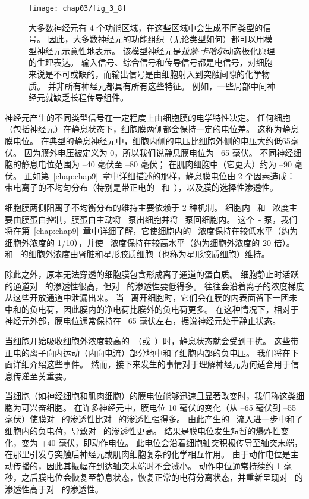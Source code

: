 \begin{figure}[htbp]
	\centering
	\texttt{[image: chap03/fig\_3\_8]}
	\caption{大多数神经元有 4 个功能区域，在这些区域中会生成不同类型的信号。
		因此，大多数神经元的功能组织（无论类型如何）都可以用模型神经元示意性地表示。
		该模型神经元是\textit{拉蒙$\cdot$卡哈尔}动态极化原理的生理表达。 
		输入信号、综合信号和传导信号都是电信号，对细胞来说是不可或缺的，而输出信号是由细胞射入到突触间隙的化学物质。
		并非所有神经元都具有所有这些特征。 
		例如，一些局部中间神经元就缺乏长程传导组件。}
	\label{fig:3_8}
\end{figure}


神经元产生的不同类型信号在一定程度上由细胞膜的电学特性决定。
任何细胞（包括神经元）在静息状态下，细胞膜两侧都会保持一定的电位差。
这称为静息膜电位。 
在典型的静息神经元中，细胞内侧的电压比细胞外侧的电压大约低65毫伏。
因为膜外电压被定义为 0，所以我们说静息膜电位为 –65 毫伏。
不同神经细胞的静息电位范围为 –40 毫伏至 –80 毫伏； 
在肌肉细胞中（它更大）约为 –90 毫伏。
正如第~\ref{chap:chap9}~章中详细描述的那样，静息膜电位由 2 个因素造成：
带电离子的不均匀分布（特别是带正电的~ 和~），以及膜的选择性渗透性。


细胞膜两侧阳离子不均衡分布的维持主要依赖于 2 种机制。
细胞内~ 和~ 浓度主要由膜蛋白控制，膜蛋白主动将~ 泵出细胞并将~ 泵回细胞内。
这个~- 泵，我们将在第~\ref{chap:chap9}~章中详细了解，它使细胞内的~ 浓度保持在较低水平（约为细胞外浓度的 1/10），并使~ 浓度保持在较高水平（约为细胞外浓度的 20 倍）。
 和~ 的细胞外浓度由肾脏和星形胶质细胞（也称为星形胶质细胞）维持。


除此之外，原本无法穿透的细胞膜包含形成离子通道的蛋白质。
细胞静止时活跃的通道对~ 的渗透性很高，但对~ 的渗透性要低得多。
 往往会沿着离子的浓度梯度从这些开放通道中泄漏出来。
当~ 离开细胞时，它们会在膜的内表面留下一团未中和的负电荷，因此膜内的净电荷比膜外的负电荷更多。
在这种情况下，相对于神经元外部，膜电位通常保持在 –65 毫伏左右，据说神经元处于静止状态。


当细胞开始吸收细胞外浓度较高的~（或~）时，静息状态就会受到干扰。
这些带正电的离子向内运动（内向电流）部分地中和了细胞内部的负电压。 
我们将在下面详细介绍这些事件。 
然而，接下来发生的事情对于理解神经元为何适合用于信息传递至关重要。


当细胞（如神经细胞和肌肉细胞）的膜电位能够迅速且显著改变时，我们称这类细胞为可兴奋细胞。 
在许多神经元中，膜电位 10 毫伏的变化（从 –65 毫伏到 –55 毫伏）使膜对~ 的渗透性比对~ 的渗透性强得多。
由此产生的~ 流入进一步中和了细胞内的负电荷，导致对~ 的渗透性更高。
结果是膜电位发生短暂的爆炸性变化，变为 +40 毫伏，即动作电位。 
此电位会沿着细胞轴突积极传导至轴突末端，在那里引发与突触后神经元或肌肉细胞复杂的化学相互作用。 
由于动作电位是主动传播的，因此其振幅在到达轴突末端时不会减小。 
动作电位通常持续约 1 毫秒，之后膜电位会恢复至静息状态，恢复正常的电荷分离状态，并重新呈现对~ 的渗透性高于对~ 的渗透性。


